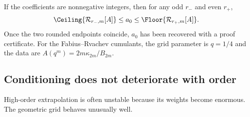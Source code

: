 \documentclass[11pt,oneside]{article}
\numberwithin{equation}{section}
\theoremstyle{definition}
\theoremstyle{remark}
\begin{document}
\begin{corollary}
\label{p1:cor:integer-brackets}
If the coefficients are nonnegative integers, then for any odd $r_-$ and even $r_+$,
\begin{equation}
 \Ceiling{\mathcal R_{r_-,m}[A]}
 \le a_0\le
 \Floor{\mathcal R_{r_+,m}[A]}.
 \label{p1:eq:integer-brackets}
\end{equation}
Once the two rounded endpoints coincide, $a_0$ has been recovered with a proof certificate.
For the Fabius--Rvachev cumulants, the grid parameter is $q=1/4$ and the data are
$A(q^m)=2m\kappa_{2m}/B_{2m}$.
\end{corollary}

\subsection{Conditioning does not deteriorate with order}

High-order extrapolation is often unstable because its weights become enormous.  The
geometric grid behaves unusually well.
\end{document}
